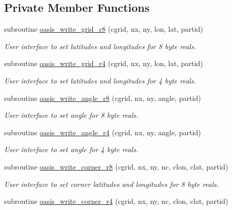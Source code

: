 \subsection*{Private Member Functions}
\begin{DoxyCompactItemize}
\item 
subroutine \hyperlink{classmod__oasis__grid_a61a1b9209b5012b58fadf2a79284e1e7}{oasis\+\_\+write\+\_\+grid\+\_\+r8} (cgrid, nx, ny, lon, lat, partid)
\begin{DoxyCompactList}\small\item\em User interface to set latitudes and longitudes for 8 byte reals. \end{DoxyCompactList}\item 
subroutine \hyperlink{classmod__oasis__grid_a74137e0541f8a9e2b1f05918b7f8da17}{oasis\+\_\+write\+\_\+grid\+\_\+r4} (cgrid, nx, ny, lon, lat, partid)
\begin{DoxyCompactList}\small\item\em User interface to set latitudes and longitudes for 4 byte reals. \end{DoxyCompactList}\item 
subroutine \hyperlink{classmod__oasis__grid_a5ffeb1d150d305f2868114faf7ebddb2}{oasis\+\_\+write\+\_\+angle\+\_\+r8} (cgrid, nx, ny, angle, partid)
\begin{DoxyCompactList}\small\item\em User interface to set angle for 8 byte reals. \end{DoxyCompactList}\item 
subroutine \hyperlink{classmod__oasis__grid_aa4f44626552980d5418d77447e1ce058}{oasis\+\_\+write\+\_\+angle\+\_\+r4} (cgrid, nx, ny, angle, partid)
\begin{DoxyCompactList}\small\item\em User interface to set angle for 4 byte reals. \end{DoxyCompactList}\item 
subroutine \hyperlink{classmod__oasis__grid_af6953999aa6fb1d0190187052bf52671}{oasis\+\_\+write\+\_\+corner\+\_\+r8} (cgrid, nx, ny, nc, clon, clat, partid)
\begin{DoxyCompactList}\small\item\em User interface to set corner latitudes and longitudes for 8 byte reals. \end{DoxyCompactList}\item 
subroutine \hyperlink{classmod__oasis__grid_a30e5d9c4766b2f323d4b930499e0f23b}{oasis\+\_\+write\+\_\+corner\+\_\+r4} (cgrid, nx, ny, nc, clon, clat, partid)

\end{DoxyCompactItemize}
